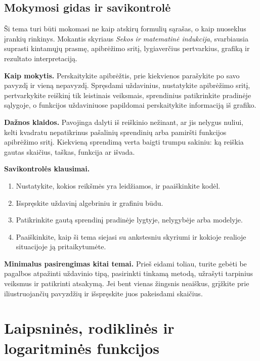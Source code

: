 \subsection{Mokymosi gidas ir savikontrolė}

Ši tema turi būti mokomasi ne kaip atskirų formulių sąrašas, o kaip nuoseklus įrankių rinkinys. Mokantis skyriaus \textit{Sekos ir matematinė indukcija}, svarbiausia suprasti kintamųjų prasmę, apibrėžimo sritį, lygiaverčius pertvarkius, grafiką ir rezultato interpretaciją.

\textbf{Kaip mokytis.} Perskaitykite apibrėžtis, prie kiekvienos parašykite po savo pavyzdį ir vieną nepavyzdį. Spręsdami uždavinius, nustatykite apibrėžimo sritį, pertvarkykite reiškinį tik leistinais veiksmais, sprendinius patikrinkite pradinėje sąlygoje, o funkcijos uždaviniuose papildomai perskaitykite informaciją iš grafiko.

\textbf{Dažnos klaidos.} Pavojinga dalyti iš reiškinio nežinant, ar jis nelygus nuliui, kelti kvadratu nepatikrinus pašalinių sprendinių arba pamiršti funkcijos apibrėžimo sritį. Kiekvieną sprendimą verta baigti trumpu sakiniu: ką reiškia gautas skaičius, taškas, funkcija ar išvada.

\textbf{Savikontrolės klausimai.}
\begin{enumerate}[label=\arabic*.]
\item Nustatykite, kokios reikšmės yra leidžiamos, ir paaiškinkite kodėl.
\item Išspręskite uždavinį algebriniu ir grafiniu būdu.
\item Patikrinkite gautą sprendinį pradinėje lygtyje, nelygybėje arba modelyje.
\item Paaiškinkite, kaip ši tema siejasi su ankstesniu skyriumi ir kokioje realioje situacijoje ją pritaikytumėte.
\end{enumerate}

\textbf{Minimalus pasirengimas kitai temai.} Prieš eidami toliau, turite gebėti be pagalbos atpažinti uždavinio tipą, pasirinkti tinkamą metodą, užrašyti tarpinius veiksmus ir patikrinti atsakymą. Jei bent vienas žingsnis neaiškus, grįžkite prie iliustruojančių pavyzdžių ir išspręskite juos pakeisdami skaičius.

\section{Laipsninės, rodiklinės ir logaritminės funkcijos}\label{sec:laipsnines-rodiklines-ir-logaritmines-funkcijos}

